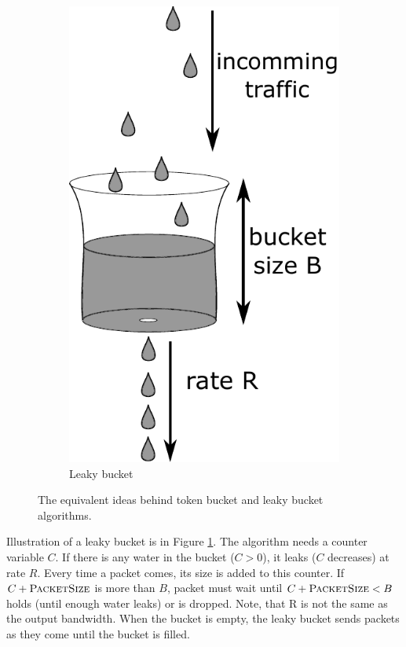 \begin{figure}
\begin{subfigure}{.4\linewidth}
		\includegraphics[width=.9\linewidth]{drawings/leaky_bucket}
		\caption{Leaky bucket}
		\label{fig08:leaky}
	\end{subfigure}
	\caption{The equivalent ideas behind token bucket and leaky bucket algorithms.}
	\label{fig08:token_leaky}
\end{figure}

Illustration of a leaky bucket is in Figure \ref{fig08:leaky}. The algorithm needs a counter variable $C$. If there is any water in the bucket ($C > 0$), it leaks ($C$ decreases) at rate $R$. Every time a packet comes, its size is added to this counter. If $C + \textsc{PacketSize}$ is more than $B$, packet must wait until $C + \textsc{PacketSize} < B$ holds (until enough water leaks) or is dropped. Note, that R is not the same as the output bandwidth. When the bucket is empty, the leaky bucket sends packets as they come until the bucket is filled. 


